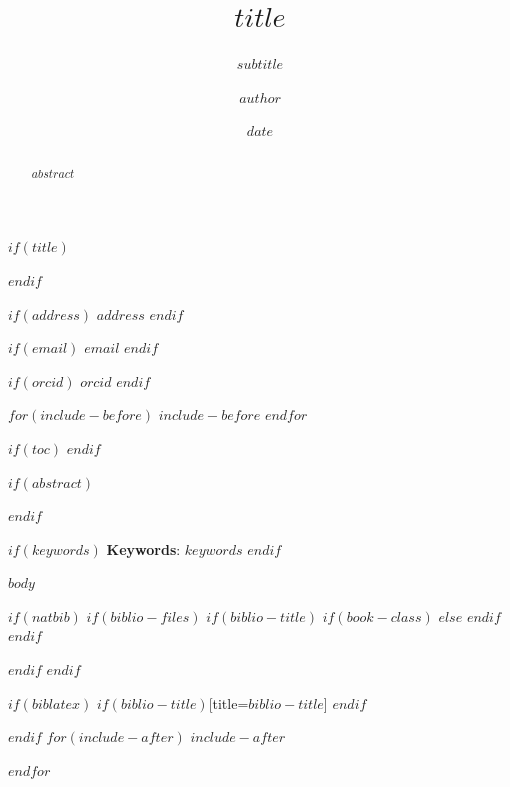 \documentclass[$if(fontsize)$$fontsize$,$endif$$if(lang)$$lang$,$endif$$if(papersize)$$papersize$,$endif$$for(classoption)$$classoption$$sep$,$endfor$]{$documentclass$}
\title{$title$}
\subtitle{$subtitle$}
\author{$author$}
\affil{$affiliation$}
\date{$date$}
\begin{document}
$if(title)$
\maketitle
$endif$

\begin{center}

$if(address)$
$address$
$endif$

$if(email)$
$email$
$endif$

$if(orcid)$
$orcid$
$endif$

$for(include-before)$
$include-before$
$endfor$

\end{center}

$if(toc)$
{
\hypersetup{linkcolor=black}
\setcounter{tocdepth}{$toc-depth$}
\tableofcontents
}
$endif$


$if(abstract)$
\begin{abstract}
$abstract$
\end{abstract}
$endif$

$if(keywords)$
\textbf{Keywords}: $keywords$
$endif$

$body$



$if(natbib)$
$if(biblio-files)$
$if(biblio-title)$
$if(book-class)$
\renewcommand\bibname{$biblio-title$}
$else$
\renewcommand\refname{$biblio-title$}
$endif$
$endif$


$endif$
$endif$

$if(biblatex)$
\printbibliography$if(biblio-title)$[title=$biblio-title$]
$endif$







$endif$
$for(include-after)$
$include-after$

$endfor$
\end{document}
